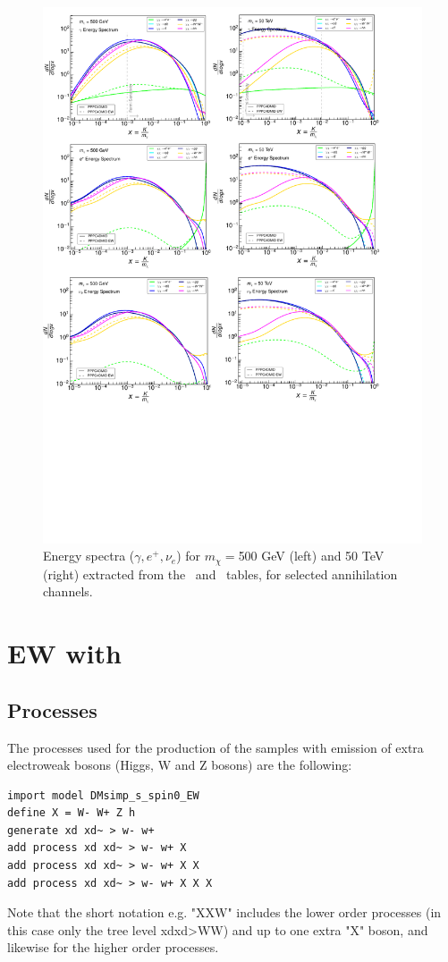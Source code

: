 \documentclass[epj,nopacs,fleqn]{svjour}
\begin{document}
\begin{figure}[!]
\begin{center}
\includegraphics[width=1\textwidth]{Fig/EW_noEW_PPPC.pdf}
\end{center}
\caption{Energy spectra ($\gamma, e^+, \nu _e$) for $m_{\chi}=$500 GeV (left) and 50 TeV (right) extracted from the \PPPC~and \PPPCew~tables, for selected annihilation channels.}
\end{figure}


\clearpage
\section{EW with \MG}
\subsection{Processes}
The processes used for the production of the samples with emission of extra electroweak bosons (Higgs, W and Z bosons) are the following:
\begin{verbatim}
import model DMsimp_s_spin0_EW
define X = W- W+ Z h
generate xd xd~ > w- w+
add process xd xd~ > w- w+ X
add process xd xd~ > w- w+ X X
add process xd xd~ > w- w+ X X X
\end{verbatim}
Note that the short notation e.g. "XXW" includes the lower order processes (in this case only the tree level xdxd>WW) and up to one extra "X" boson, and likewise for the higher order processes. \\
\end{document}
